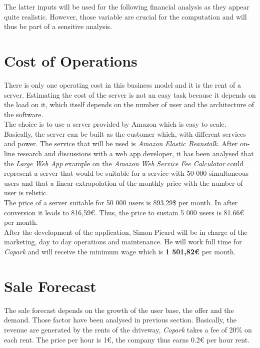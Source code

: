 \documentclass[12pt,a4paper,oneside]{book}
\newcommand{\bp}{\textit{Copark }}
\begin{document}
The latter inputs will be used for the following financial analysis as they appear quite realistic. However, those variable are crucial for the computation and will thus be part of a sensitive analysis.


\section{Cost of Operations}
There is only one operating cost in this business model and it is the rent of a server. Estimating the cost of the server is not an easy task because it depends on the load on it, which itself depends on the number of user and the architecture of the software.\\

The choice is to use a server provided by Amazon which is easy to scale. Basically, the server can be built as the customer which, with different services and power. The service that will be used is \textit{Amazon Elastic Beanstalk}. After on-line research and discussions with a web app developer, it has been analysed that the \textit{Large Web App} example on the \textit{Amazon Web Service Fee Calculator} could represent a server that would be suitable for a service with 50 000 simultaneous users and that a linear extrapolation of the monthly price with the number of user is relistic.\cite{itwlois}\cite{qaws}\cite{hsaws}\\

The price of a server suitable for 50 000 users is 893.29\$ per month.\cite{awsclwa} In after conversion it leads to 816,59\euro{}. Thus, the price to sustain 5 000 users is 81.66\euro{} per month.\\

After the development of the application, Simon Picard will be in charge of the marketing, day to day operations and maintenance. He will work full time for \bp and will receive the minimum wage which is \textbf{1 501,82\euro{}} per month.\cite{eurostatmw}\\


\section{Sale Forecast}

The sale forecast depends on the growth of the user base, the offer and the demand. Those factor have been analysed in previous section. Basically, the revenue are generated by the rents of the driveway, \bp takes a fee of 20\% on each rent. The price per hour is 1\euro{}, the company thus earns 0.2\euro{} per hour rent.\\
\end{document}
